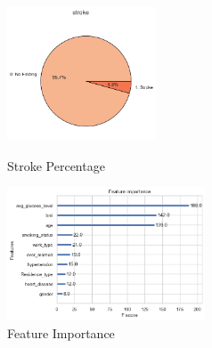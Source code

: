 \documentclass{article}
\begin{document}
\begin{figure}[!htb]
  \includegraphics[width=\linewidth,height = 150]{stroke percantage.png}
  \caption{Stroke Percentage}\label{Pie}
\endminipage\hfill
{}%
  \includegraphics[width=\linewidth,height = 150]{FeatureImportance.png}
  \caption{Feature Importance}\label{F}
\endminipage
\end{figure}

  
  
\end{document}
